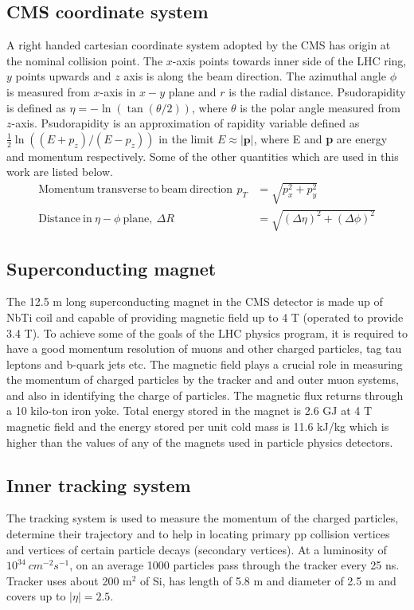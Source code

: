 \subsection{CMS coordinate system}
A right handed cartesian coordinate system adopted by the CMS has origin at the nominal collision point. The $x$-axis points towards inner 
side of the LHC ring, $y$ points upwards and $z$ axis is along the beam direction. The azimuthal angle $\phi$ is measured from $x$-axis in 
$x-y$ plane and $r$ is the radial distance. Psudorapidity is defined as $\eta = - \ln(\tan(\theta/2))$, where $\theta$ is the polar angle 
measured from $z$-axis. Psudorapidity is an approximation of rapidity variable defined as $\frac{1}{2}\ln((E+p_z)/(E-p_z))$ in the limit 
$E\approx |\textbf{p}|$, where E and \textbf{p} are energy and momentum respectively. Some of the other quantities which are used in this 
work are listed below.
\begin{align}
\mathrm{Momentum\ transverse\ to\ beam\ direction\,\ } p_T & = \sqrt{p_{x}^2 + p_{y}^2}\\
\mathrm{Distance\ in\ }\eta-\phi \ \mathrm{plane,}\ \Delta R & = \sqrt{(\Delta \eta)^2 + (\Delta \phi)^2}
\end{align}

\subsection{Superconducting magnet}
The 12.5 m long superconducting magnet in the CMS detector is made up of NbTi coil and capable of providing magnetic field up to 4 T 
(operated to provide 3.4 T). To achieve some of the goals of the LHC physics program, it is required 
to have a good momentum resolution of muons and other charged 
particles, tag tau leptons and b-quark jets etc. The magnetic field plays a crucial role in measuring the momentum of charged particles by 
the tracker and and outer muon systems, and also in identifying the charge of particles. The magnetic flux returns through a 10 kilo-ton 
iron yoke. Total energy stored in the magnet is 2.6 GJ at 4 T magnetic field and the energy stored per unit cold mass is 11.6 kJ/kg which 
is higher than the values of any of the magnets used in particle physics detectors.
\subsection{Inner tracking system}
The tracking system is used to measure the momentum of the charged particles, determine their trajectory and to help in locating primary 
pp collision vertices and vertices of certain particle decays (secondary vertices). At a luminosity of $10^{34}\ cm^{-2}s^{-1}$, on an 
average 1000 particles pass through the tracker every 25 ns. 
Tracker uses about 200 m$^2$ of Si, has length of 5.8 m and diameter of 2.5 m and covers up to $|\eta| = 2.5$. 


